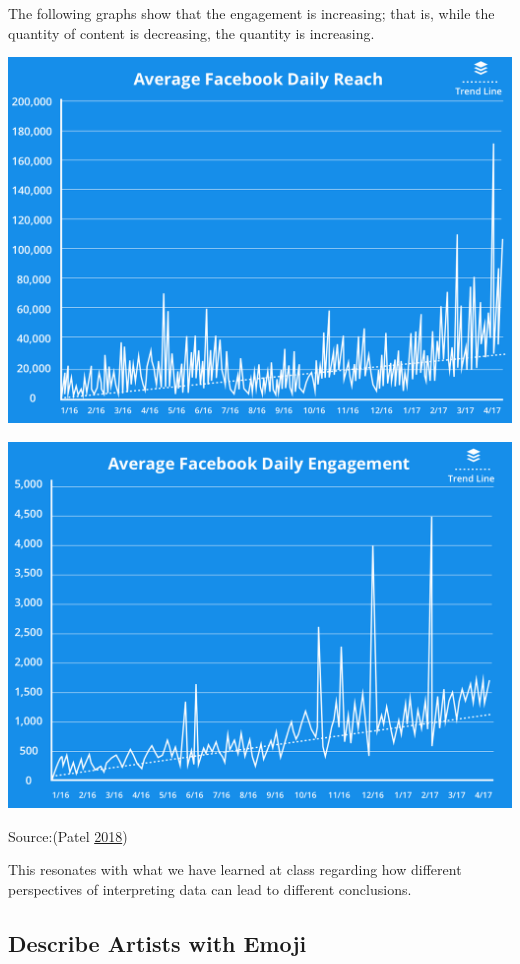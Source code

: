 \documentclass[]{book}
\begin{document}
The following graphs show that the engagement is increasing; that is, while the quantity of content is decreasing, the quantity is increasing.

\includegraphics{images/average-facebook-reach.png}

\includegraphics{images/average-facebook-daily-reach.png}

Source:(Patel \protect\hyperlink{ref-facebook_organic}{2018})

This resonates with what we have learned at class regarding how different perspectives of interpreting data can lead to different conclusions.

\hypertarget{describe-artists-with-emoji}{%
\subsection{Describe Artists with Emoji}\label{describe-artists-with-emoji}}
\end{document}
